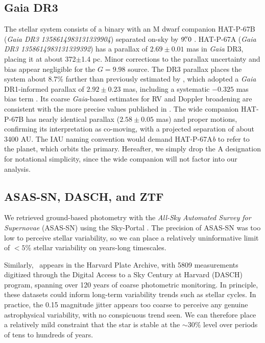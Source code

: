 \documentclass[twocolumn]{aastex631}
\newcommand{\hatp}{\object{HAT-P-67}~}
\begin{document}
\subsection{Gaia DR3}\label{gaiadr3}
The stellar system consists of a binary with an M dwarf companion HAT-P-67B (\emph{Gaia DR3 1358614983131339904}) separated on-sky by $9\mbox{$.\!\!^{\prime\prime}$}0$ \citep{2019MNRAS.490.5088M}.  HAT-P-67A (\emph{Gaia DR3 1358614983131339392}) has a parallax of $2.69\pm0.01$ mas in \emph{Gaia} DR3, placing it at about 372$\pm$1.4 pc.  Minor corrections to the parallax uncertainty \citep{2021MNRAS.506.2269E} and bias \citep{2021A&A...649A...4L} appear negligible for the $G=9.98$ source.  The DR3 parallax places the system about 8.7\% farther than previously estimated by \citet{2017AJ....153..211Z}, which adopted a \emph{Gaia} DR1-informed parallax of $2.92\pm0.23$ mas, including a systematic $-0.325$ mas bias term \citep{2016ApJ...831L...6S}.  Its coarse \emph{Gaia}-based estimates for RV and Doppler broadening are consistent with the more precise values published in \citet{2017AJ....153..211Z}.  The wide companion HAT-P-67B has nearly identical parallax ($2.58\pm0.05$ mas) and proper motions, confirming its interpretation as co-moving, with a projected separation of about 3400 AU.  The IAU naming convention would demand HAT-P-67A\emph{b} to refer to the planet, which orbits the primary.  Hereafter, we simply drop the A designation for notational simplicity, since the wide companion will not factor into our analysis.

\subsection{ASAS-SN, DASCH, and ZTF}
We retrieved ground-based photometry with the \emph{All-Sky Automated Survey for Supernovae} (ASAS-SN) using the Sky-Portal \citep{shappee14,2017PASP..129j4502K}.  The precision of ASAS-SN was too low to perceive stellar variability, so we can place a relatively uninformative limit of $<5\%$ stellar variability on years-long timescales.

Similarly, \hatp appears in the Harvard Plate Archive, with 5809 measurements digitized through the Digital Access to a Sky Century at Harvard (DASCH) program, spanning over 120 years of coarse photometric monitoring.  In principle, these datasets could inform long-term variability trends such as stellar cycles.  In practice, the 0.15 magnitude jitter appears too coarse to perceive any genuine astrophysical variability, with no conspicuous trend seen.  We can therefore place a relatively mild constraint that the star is stable at the $\sim30\%$ level over periods of tens to hundreds of years.
\end{document}
